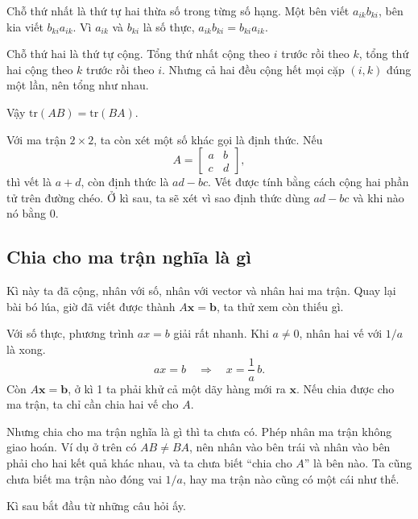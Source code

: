\documentclass[12pt,a4paper]{article}
\begin{document}
Chỗ thứ nhất là thứ tự hai thừa số trong từng số hạng. Một bên viết \(a_{ik}b_{ki}\), bên kia viết \(b_{ki}a_{ik}\). Vì \(a_{ik}\) và \(b_{ki}\) là số thực, \(a_{ik}b_{ki}=b_{ki}a_{ik}\).

Chỗ thứ hai là thứ tự cộng. Tổng thứ nhất cộng theo \(i\) trước rồi theo \(k\), tổng thứ hai cộng theo \(k\) trước rồi theo \(i\). Nhưng cả hai đều cộng hết mọi cặp \((i,k)\) đúng một lần, nên tổng như nhau.

Vậy \(\mathrm{tr}(AB)=\mathrm{tr}(BA)\).

Với ma trận \(2\times2\), ta còn xét một số khác gọi là định thức. Nếu
$$
A=\left[ \begin{array}{cc} a & b\\ c & d \end{array} \right],
$$
thì vết là \(a+d\), còn định thức là \(ad-bc\). Vết được tính bằng cách cộng hai phần tử trên đường chéo. Ở kì sau, ta sẽ xét vì sao định thức dùng \(ad-bc\) và khi nào nó bằng \(0\).

\subsection{Chia cho ma trận nghĩa là gì}

Kì này ta đã cộng, nhân với số, nhân với vector và nhân hai ma trận. Quay lại bài bó lúa, giờ đã viết được thành \(A\mathbf{x}=\mathbf{b}\), ta thử xem còn thiếu gì.

Với số thực, phương trình \(ax=b\) giải rất nhanh. Khi \(a\neq0\), nhân hai vế với \(1/a\) là xong.
$$
ax=b\quad\Longrightarrow\quad x=\frac1a\,b.
$$
Còn \(A\mathbf{x}=\mathbf{b}\), ở kì 1 ta phải khử cả một dãy hàng mới ra \(\mathbf{x}\). Nếu chia được cho ma trận, ta chỉ cần chia hai vế cho \(A\).

Nhưng chia cho ma trận nghĩa là gì thì ta chưa có. Phép nhân ma trận không giao hoán. Ví dụ ở trên có \(AB\neq BA\), nên nhân vào bên trái và nhân vào bên phải cho hai kết quả khác nhau, và ta chưa biết ``chia cho \(A\)'' là bên nào. Ta cũng chưa biết ma trận nào đóng vai \(1/a\), hay ma trận nào cũng có một cái như thế.

Kì sau bắt đầu từ những câu hỏi ấy.
\end{document}
